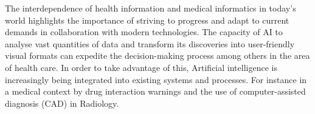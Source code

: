 The interdependence of health information and medical informatics in today's world highlights the importance of striving to progress and adapt to current demands in collaboration with modern technologies.
%
% 
The capacity of AI to analyse vast quantities of data and transform its discoveries into user-friendly visual formats can expedite the decision-making process among others in the area of health care. 
In order to take advantage of this, Artificial intelligence is increasingly being integrated into existing systems and processes.
For instance in a medical context by drug interaction warnings\citep{akyon_polypharmacy_2023} and the use of computer-assisted diagnosis (CAD) in Radiology\citep{amisha_ai_medicine_2019}.
%
